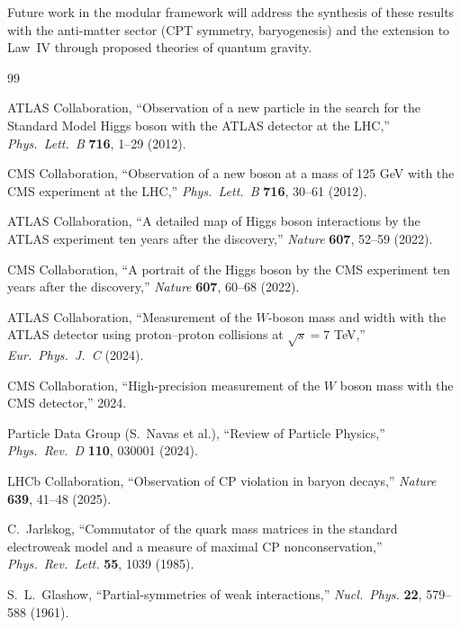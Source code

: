 \documentclass[12pt]{article}
\theoremstyle{definition}
\theoremstyle{remark}
\begin{document}
Future work in the modular framework will address the synthesis of these results with the anti-matter sector (CPT symmetry, baryogenesis) and the extension to Law~IV through proposed theories of quantum gravity.

\begin{thebibliography}{99}

ATLAS Collaboration, ``Observation of a new particle in the search for the Standard Model Higgs boson with the ATLAS detector at the LHC,'' \textit{Phys.\ Lett.\ B} \textbf{716}, 1--29 (2012).

CMS Collaboration, ``Observation of a new boson at a mass of 125 GeV with the CMS experiment at the LHC,'' \textit{Phys.\ Lett.\ B} \textbf{716}, 30--61 (2012).

ATLAS Collaboration, ``A detailed map of Higgs boson interactions by the ATLAS experiment ten years after the discovery,'' \textit{Nature} \textbf{607}, 52--59 (2022).

CMS Collaboration, ``A portrait of the Higgs boson by the CMS experiment ten years after the discovery,'' \textit{Nature} \textbf{607}, 60--68 (2022).

ATLAS Collaboration, ``Measurement of the $W$-boson mass and width with the ATLAS detector using proton--proton collisions at $\sqrt{s} = 7$ TeV,'' \textit{Eur.\ Phys.\ J.\ C} (2024).

CMS Collaboration, ``High-precision measurement of the $W$ boson mass with the CMS detector,'' 2024.

Particle Data Group (S.\ Navas et al.), ``Review of Particle Physics,'' \textit{Phys.\ Rev.\ D} \textbf{110}, 030001 (2024).

LHCb Collaboration, ``Observation of CP violation in baryon decays,'' \textit{Nature} \textbf{639}, 41--48 (2025).

C.\ Jarlskog, ``Commutator of the quark mass matrices in the standard electroweak model and a measure of maximal CP nonconservation,'' \textit{Phys.\ Rev.\ Lett.} \textbf{55}, 1039 (1985).

S.\ L.\ Glashow, ``Partial-symmetries of weak interactions,'' \textit{Nucl.\ Phys.} \textbf{22}, 579--588 (1961).


\end{thebibliography}
\end{document}
